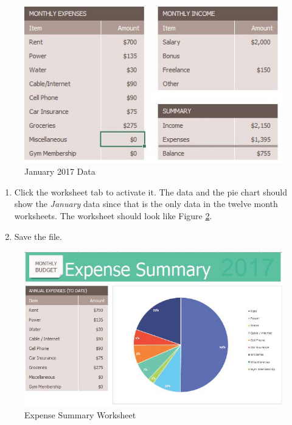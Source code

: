 \begin{figure}[H]
	\centering
	\includegraphics[width=\maxwidth{.95\linewidth}]{gfx/ch06_fig13}
	\caption{January 2017 Data}
	\label{06:fig13}
\end{figure}

\begin{enumerate}[resume]
	\item Click the  worksheet tab to activate it. The data and the pie chart should show the \textit{January} data since that is the only data in the twelve month worksheets. The worksheet should look like Figure \ref{06:fig14}.
	\item Save the file.
\end{enumerate}

\begin{figure}[H]
	\centering
	\includegraphics[width=\maxwidth{.95\linewidth}]{gfx/ch06_fig14}
	\caption{Expense Summary Worksheet}
	\label{06:fig14}
\end{figure}

